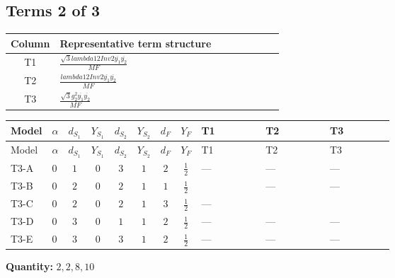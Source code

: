 \documentclass[8pt]{article}
\begin{document}
\begin{landscape}
\subsection*{Terms 2 of 3}
\begin{center}
\begin{tabular}{@{}c >{\raggedright\arraybackslash}p{0.82\linewidth}@{}}
\toprule
Column & Representative term structure \\
\midrule
T1 & \(\displaystyle \frac{\sqrt{3} lambda12Inv2 \overline{y_{1}} \overline{y_{2}}}{MF}\) \\
\midrule
T2 & \(\displaystyle \frac{lambda12Inv2 \overline{y_{1}} \overline{y_{2}}}{MF}\) \\
\midrule
T3 & \(\displaystyle \frac{\sqrt{3} g_{2}^{2} \overline{y_{1}} \overline{y_{2}}}{MF}\) \\
\midrule
\bottomrule
\end{tabular}
\end{center}
\smallskip
\tiny
\begin{longtable}{@{}llcccccc >{\raggedright\arraybackslash}p{0.21\linewidth} >{\raggedright\arraybackslash}p{0.21\linewidth} >{\raggedright\arraybackslash}p{0.21\linewidth}@{}}
\toprule
Model & $\alpha$ & $d_{S_1}$ & $Y_{S_1}$ & $d_{S_2}$ & $Y_{S_2}$ & $d_F$ & $Y_F$ & T1 & T2 & T3 \\
\midrule
\endfirsthead
\toprule
Model & $\alpha$ & $d_{S_1}$ & $Y_{S_1}$ & $d_{S_2}$ & $Y_{S_2}$ & $d_F$ & $Y_F$ & T1 & T2 & T3 \\
\midrule
\endhead
T3-A & $0$ & $1$ & $0$ & $3$ & $1$ & $2$ & $\frac{1}{2}$ & --- & --- & --- \\
\midrule
T3-B & $0$ & $2$ & $0$ & $2$ & $1$ & $1$ & $\frac{1}{2}$ & \scriptsize\adjustbox{max width=\linewidth}{$\begin{gathered} \frac{\sqrt{3} lambda12Inv2 \overline{y_{1}} \overline{y_{2}}}{3 MF}\end{gathered}$} & --- & --- \\
\midrule
T3-C & $0$ & $2$ & $0$ & $2$ & $1$ & $3$ & $\frac{1}{2}$ & --- & \scriptsize\adjustbox{max width=\linewidth}{$\begin{gathered} - \frac{lambda12Inv2 \overline{y_{1}} \overline{y_{2}}}{3 MF}\end{gathered}$} & \scriptsize\adjustbox{max width=\linewidth}{$\begin{gathered} - \frac{\sqrt{3} g_{2}^{2} \overline{y_{1}} \overline{y_{2}}}{4 MF}\end{gathered}$} \\
\midrule
T3-D & $0$ & $3$ & $0$ & $1$ & $1$ & $2$ & $\frac{1}{2}$ & --- & --- & --- \\
\midrule
T3-E & $0$ & $3$ & $0$ & $3$ & $1$ & $2$ & $\frac{1}{2}$ & --- & --- & --- \\
\midrule
\bottomrule
\end{longtable}
\clearpage
\noindent\textbf{Quantity: }$\mathrm{2,2,8,10}$\par\smallskip

\end{landscape}
\end{document}
